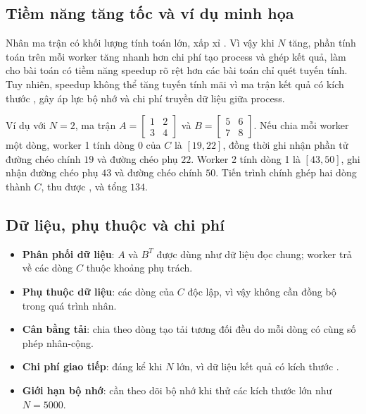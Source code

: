 \subsection{Tiềm năng tăng tốc và ví dụ minh họa}
Nhân ma trận có khối lượng tính toán lớn, xấp xỉ . Vì vậy khi $N$ tăng, phần tính toán trên mỗi worker tăng nhanh hơn chi phí tạo process và ghép kết quả, làm cho bài toán có tiềm năng speedup rõ rệt hơn các bài toán chỉ quét tuyến tính. Tuy nhiên, speedup không thể tăng tuyến tính mãi vì ma trận kết quả có kích thước , gây áp lực bộ nhớ và chi phí truyền dữ liệu giữa process.

Ví dụ với $N=2$, ma trận $A=\begin{bmatrix}1&2\\3&4\end{bmatrix}$ và $B=\begin{bmatrix}5&6\\7&8\end{bmatrix}$. Nếu chia mỗi worker một dòng, worker 1 tính dòng 0 của $C$ là $[19,22]$, đồng thời ghi nhận phần tử đường chéo chính $19$ và đường chéo phụ $22$. Worker 2 tính dòng 1 là $[43,50]$, ghi nhận đường chéo phụ $43$ và đường chéo chính $50$. Tiến trình chính ghép hai dòng thành $C$, thu được ,  và tổng $134$.

\subsection{Dữ liệu, phụ thuộc và chi phí}
\begin{itemize}
  \item \textbf{Phân phối dữ liệu}: $A$ và $B^T$ được dùng như dữ liệu đọc chung; worker trả về các dòng $C$ thuộc khoảng phụ trách.
  \item \textbf{Phụ thuộc dữ liệu}: các dòng của $C$ độc lập, vì vậy không cần đồng bộ trong quá trình nhân.
  \item \textbf{Cân bằng tải}: chia theo dòng tạo tải tương đối đều do mỗi dòng có cùng số phép nhân-cộng.
  \item \textbf{Chi phí giao tiếp}: đáng kể khi $N$ lớn, vì dữ liệu kết quả có kích thước .
  \item \textbf{Giới hạn bộ nhớ}: cần theo dõi bộ nhớ khi thử các kích thước lớn như $N=5000$.
\end{itemize}

